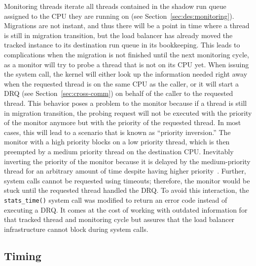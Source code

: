 Monitoring threads iterate all threads contained in the shadow run queue assigned to the CPU they are running on (see Section~\ref{sec:des:monitoring}).
Migrations are not instant, and thus there will be a point in time where a thread is still in migration transition, but the load balancer has already moved the tracked instance to its destination run queue in its bookkeeping.
This leads to complications when the migration is not finished until the next monitoring cycle, as a monitor will try to probe a thread that is not on its CPU yet.
When issuing the system call, the kernel will either look up the information needed right away when the requested thread is on the same CPU as the caller, or it will start a DRQ (see Section~\ref{sec:cross-comm}) on behalf of the caller to the requested thread.
This behavior poses a problem to the monitor because if a thread is still in migration transition, the probing request will not be executed with the priority of the monitor anymore but with the priority of the requested thread.
In most cases, this will lead to a scenario that is known as \enquote{priority inversion.}
The monitor with a high priority blocks on a low priority thread, which is then preempted by a medium priority thread on the destination CPU.
Inevitably inverting the priority of the monitor because it is delayed by the medium-priority thread for an arbitrary amount of time despite having higher priority~\cite{priority-inheritance-protocols}.
Further, system calls cannot be requested using timeouts; therefore, the monitor would be stuck until the requested thread handled the DRQ.
To avoid this interaction, the \texttt{stats\_time()} system call was modified to return an error code instead of executing a DRQ.
It comes at the cost of working with outdated information for that tracked thread and monitoring cycle but assures that the load balancer infrastructure cannot block during system calls.

\subsection{Timing}

